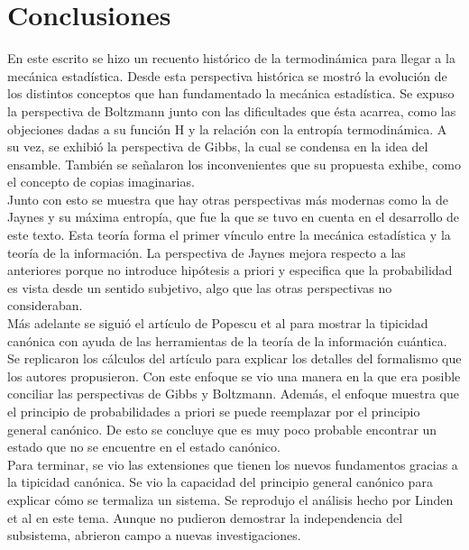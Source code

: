 \chapter{Conclusiones}

En este escrito se hizo un recuento histórico de la termodinámica para llegar a la mecánica estadística. Desde esta perspectiva histórica se mostró la evolución de los distintos conceptos que han fundamentado la mecánica estadística. Se expuso la perspectiva de Boltzmann junto con las dificultades que ésta acarrea, como las objeciones dadas a su función H y la relación con la entropía termodinámica. A su vez, se exhibió la perspectiva de Gibbs, la cual se condensa en la idea del ensamble. También se señalaron los inconvenientes que su propuesta exhibe, como el concepto de copias imaginarias. \\
Junto con esto se muestra que hay otras perspectivas más modernas como la de Jaynes y su máxima entropía, que fue la que se tuvo en cuenta en el desarrollo de este texto. Esta teoría forma el primer vínculo entre la mecánica estadística y la teoría de la información. La perspectiva de Jaynes mejora respecto a las anteriores porque no introduce hipótesis a priori y especifica que la probabilidad es vista desde un sentido subjetivo, algo que las otras perspectivas no consideraban.
\\
Más adelante se siguió el artículo de Popescu et al  \cite{Popescu2006} para mostrar la tipicidad canónica con ayuda de las herramientas de la teoría de la información cuántica. Se replicaron los cálculos del artículo para explicar los detalles del formalismo que los autores propusieron. Con este enfoque se vio una manera en la que era posible conciliar las perspectivas de Gibbs y Boltzmann. Además, el enfoque muestra que el principio de probabilidades a priori se puede reemplazar por el principio general canónico. De esto se concluye que es muy poco probable encontrar un estado que no se encuentre en el estado canónico.
\\
Para terminar, se vio las extensiones que tienen los nuevos fundamentos gracias a la tipicidad canónica. Se vio la capacidad del principio general canónico para explicar cómo se termaliza un sistema. Se reprodujo el análisis hecho por Linden et al \cite{LindenPaper} en este tema. Aunque no pudieron demostrar la independencia del subsistema, abrieron campo a nuevas investigaciones.